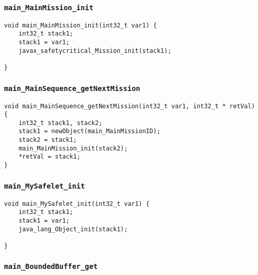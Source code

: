 \begin{landscape}
\begin{multicols}{2}
\subsubsection{\texttt{main\_MainMission\_init}}

\begin{lstlisting}[firstnumber=1871]
void main_MainMission_init(int32_t var1) {
	int32_t stack1;
	stack1 = var1;
	javax_safetycritical_Mission_init(stack1);

}
\end{lstlisting}

\subsubsection{\texttt{main\_MainSequence\_getNextMission}}

\begin{lstlisting}[firstnumber=1983]
void main_MainSequence_getNextMission(int32_t var1, int32_t * retVal) {
	int32_t stack1, stack2;
	stack1 = newObject(main_MainMissionID);
	stack2 = stack1;
	main_MainMission_init(stack2);
	*retVal = stack1;
}
\end{lstlisting}

\subsubsection{\texttt{main\_MySafelet\_init}}

\begin{lstlisting}[firstnumber=2084]
void main_MySafelet_init(int32_t var1) {
	int32_t stack1;
	stack1 = var1;
	java_lang_Object_init(stack1);

}
\end{lstlisting}

\subsubsection{\texttt{main\_BoundedBuffer\_get}}


\end{multicols}
\end{landscape}
